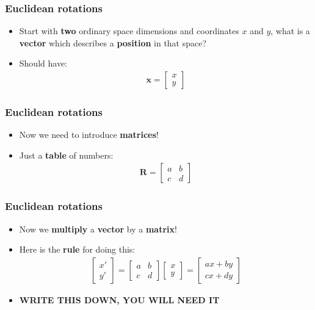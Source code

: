 \documentclass{beamer}
\begin{document}
\begin{frame}
  \frametitle{Euclidean rotations}
  \begin{itemize}
    \item<1-> Start with \textbf{two} ordinary space dimensions and coordinates $x$ and $y$, what is a \textbf{vector} which describes a \textbf{position} in that space?
    \item<2-> Should have:
      \begin{align*}
	\mathbf{x}=
	\begin{bmatrix}
	  x\\
	  y
	\end{bmatrix}
      \end{align*}
  \end{itemize}
\end{frame}

\begin{frame}
  \frametitle{Euclidean rotations}
  \begin{itemize}
    \item<1-> Now we need to introduce \textbf{matrices}!
    \item<2-> Just a \textbf{table} of numbers:
      \begin{align*}
	\mathbf{R}=
	\begin{bmatrix}
	  a & b\\
	  c & d
	\end{bmatrix}
      \end{align*}
  \end{itemize}
\end{frame}

\begin{frame}
  \frametitle{Euclidean rotations}
  \begin{itemize}
    \item<1-> Now we \textbf{multiply} a \textbf{vector} by a \textbf{matrix}!
    \item<2-> Here is the \textbf{rule} for doing this:
      \begin{align*}
	\begin{bmatrix}
	  x'\\
	  y'
	\end{bmatrix}
	=
	\begin{bmatrix}
	  a & b\\
	  c & d
	\end{bmatrix}
	\begin{bmatrix}
	  x\\
	  y
	\end{bmatrix}
	=
	\begin{bmatrix}
	 ax+by\\
	 cx+dy
	\end{bmatrix}
      \end{align*}
    \item<3-> \textbf{WRITE THIS DOWN, YOU WILL NEED IT}
  \end{itemize}
\end{frame}
\end{document}
